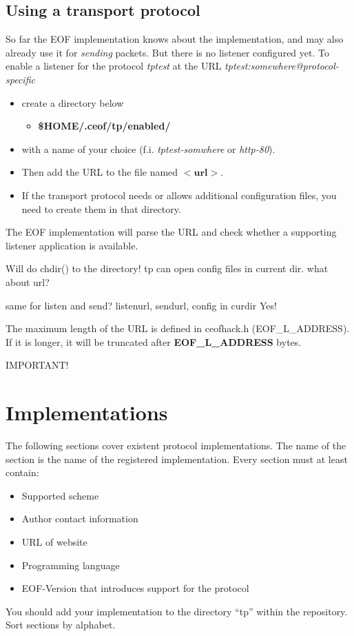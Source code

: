 \documentclass[12pt,a4paper]{book}
\begin{document}
\subsection{Using a transport protocol}
So far the EOF implementation knows about the implementation, and may also
already use it for \emph{sending} packets. But there is no listener configured
yet.
To enable a listener for the protocol \emph{tptest} at the URL
\emph{tptest:somewhere@protocol-specific}
\begin{itemize}
\item create a directory below
\begin{itemize}
\item \textbf{\$HOME/.ceof/tp/enabled/}
\end{itemize}
\item with a name of your choice (f.i. \emph{tptest-somwhere} or \emph{http-80}).
\item Then add the URL to the file named $<\textbf{url}>$.
\item If the transport protocol needs or allows additional configuration files,
you need to create them in that directory.
\end{itemize}
The EOF implementation will parse the URL and check whether a supporting
listener application is available.

Will do chdir() to the directory! tp can open config files in current dir.
what about url?

same for listen and send?
   listenurl, sendurl, config in curdir
Yes!

The maximum length of the URL is defined in ceofhack.h (EOF\_L\_ADDRESS).
If it is longer, it will be truncated after \textbf{EOF\_L\_ADDRESS} bytes.

IMPORTANT!
\section{Implementations}
The following sections cover existent protocol implementations.
The name of the section is the name of the registered implementation.
Every section must at least contain:
\begin{itemize}
\item Supported scheme
\item Author contact information
\item URL of website
\item Programming language
\item EOF-Version that introduces support for the protocol
\end{itemize}
You should add your implementation to the directory "`tp"' within the
repository.
Sort sections by alphabet.
\end{document}
